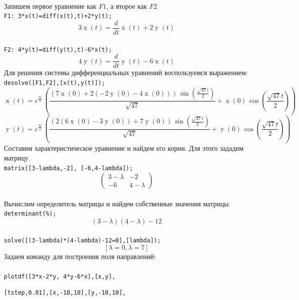 \documentclass[article, bachelor, och, pract]{SCWorks}
\begin{document}
\begin{itemize}
$$$$\\
Запишем первое уравнение как $F1$, а второе как $F2$\\
\texttt{F1: 3*x(t)=diff(x(t),t)+2*y(t);}\\
\[3\operatorname{x}(t)=\frac{d}{dt}\operatorname{x}(t)+2\operatorname{y}(t)\]
\\
\texttt{F2: 4*y(t)=diff(y(t),t)-6*x(t);}\\
\[4\operatorname{y}(t)=\frac{d}{dt}\operatorname{y}(t)-6\operatorname{x}(t)\]
Для решения системы дифференциальных уравнений воспользуемся выражением:\\
\texttt{desolve([F1,F2],[x(t),y(t)]);}\\
\[\operatorname{x}(t)={{e}^{\frac{7t}{2}}}\,\left( \frac{\left( 7\operatorname{x}(0)+2\left( -2\operatorname{y}(0)-4\operatorname{x}(0)\right) \right) \,\sin{\left( \frac{\sqrt{47}t}{2}\right) }}{\sqrt{47}}+\operatorname{x}(0)\,\cos{\left( \frac{\sqrt{47}t}{2}\right) }\right) \]
\[\operatorname{y}(t)={{e}^{\frac{7t}{2}}}\,\left( \frac{\left( 2\left( 6\operatorname{x}(0)-3\operatorname{y}(0)\right) +7\operatorname{y}(0)\right) \,\sin{\left( \frac{\sqrt{47}t}{2}\right) }}{\sqrt{47}}+\operatorname{y}(0)\,\cos{\left( \frac{\sqrt{47}t}{2}\right) }\right) \]
Составим характеристическое уравнение и найдем его корни. Для этого зададим матрицу.\\
\texttt{matrix([3-lambda,-2], [-6,4-lambda]);}\\
$$\begin{pmatrix}
3-\lambda & -2\\
-6 & 4-\lambda
\end{pmatrix}$$\\
Вычислим определитель матрицы и найдем собственные значения матрицы.\\
\texttt{determinant(\%);}\\
$$(3-\lambda)(4-\lambda)-12$$\\
\texttt{solve([(3-lambda)*(4-lambda)-12=0],[lambda]);}\\
$$[\lambda=0, \lambda=7]$$
Задаем команду для построения поля направлений:\\
\texttt{	}\\
\texttt{plotdf([3*x-2*y, 4*y-6*x],[x,y],}

\texttt{[tstep,0.01],[x,-10,10],[y,-10,10],}


\end{itemize}
\end{document}
